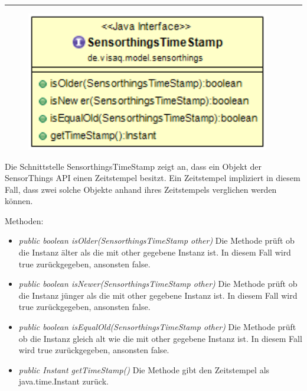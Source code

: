\rule{\textwidth}{0.4pt}
\begin{minipage}{0.4\textwidth}
    \begin{figure}[H]
        {\centering\includegraphics[width=0.95\textwidth]{media/backend/modell/classes/SensorthingsTimeStamp.png}}
    \end{figure}
    \end{minipage} \hfill
\begin{minipage}{0.6\textwidth}
Die Schnittstelle SensorthingsTimeStamp zeigt an, dass ein Objekt der \gls{SensorThings API} einen Zeitstempel besitzt.
Ein Zeitstempel impliziert in diesem Fall, dass zwei solche Objekte anhand ihres Zeitstempels verglichen werden können.
\end{minipage}

Methoden: \begin{itemize}
    \item \emph{public boolean isOlder(SensorthingsTimeStamp other)} Die Methode prüft ob die Instanz älter als die mit other gegebene Instanz ist.
    In diesem Fall wird true zurückgegeben, ansonsten false.
    \item \emph{public boolean isNewer(SensorthingsTimeStamp other)} Die Methode prüft ob die Instanz jünger als die mit other gegebene Instanz ist.
    In diesem Fall wird true zurückgegeben, ansonsten false.
    \item \emph{public boolean isEqualOld(SensorthingsTimeStamp other)} Die Methode prüft ob die Instanz gleich alt wie die mit other gegebene Instanz ist.
    In diesem Fall wird true zurückgegeben, ansonsten false.
    \item \emph{public Instant getTimeStamp()} Die Methode gibt den Zeitstempel als java.time.Instant zurück.
\end{itemize}

